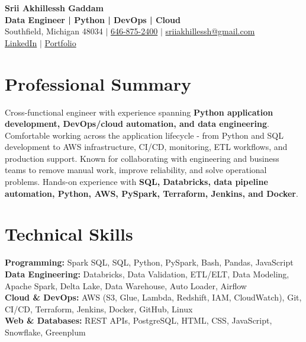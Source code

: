 \documentclass[letterpaper,10pt]{article}
\begin{document}
\fontsize{9.35pt}{10.45pt}\selectfont

\begin{center}
    {\LARGE \textbf{Srii Akhillessh Gaddam}} \\[-1pt]
    \textbf{Data Engineer | Python | DevOps | Cloud} \\[2pt]
    Southfield, Michigan 48034 $|$
    \href{tel:6468752400}{646-875-2400} $|$
    \href{mailto:sriiakhillessh@gmail.com}{sriiakhillessh@gmail.com} \\[1pt]
    \href{https://www.linkedin.com/in/srii-akhiilessh-gaddam-b48668191/}{LinkedIn} $|$
    \href{https://sriiakhillesshg.github.io/portfolio/}{Portfolio}
\end{center}
\vspace{-8pt}

\section{Professional Summary}
\small{Cross-functional engineer with experience spanning \textbf{Python application development, DevOps/cloud automation, and data engineering}. Comfortable working across the application lifecycle - from Python and SQL development to AWS infrastructure, CI/CD, monitoring, ETL workflows, and production support. Known for collaborating with engineering and business teams to remove manual work, improve reliability, and solve operational problems. Hands-on experience with \textbf{SQL, Databricks, data pipeline automation, Python, AWS, PySpark, Terraform, Jenkins, and Docker}.}

\section{Technical Skills}
\small{
\textbf{Programming:} Spark SQL, SQL, Python, PySpark, Bash, Pandas, JavaScript \\
\textbf{Data Engineering:} Databricks, Data Validation, ETL/ELT, Data Modeling, Apache Spark, Delta Lake, Data Warehouse, Auto Loader, Airflow \\
\textbf{Cloud \& DevOps:} AWS (S3, Glue, Lambda, Redshift, IAM, CloudWatch), Git, CI/CD, Terraform, Jenkins, Docker, GitHub, Linux \\
\textbf{Web \& Databases:} REST APIs, PostgreSQL, HTML, CSS, JavaScript, Snowflake, Greenplum
}
\end{document}
